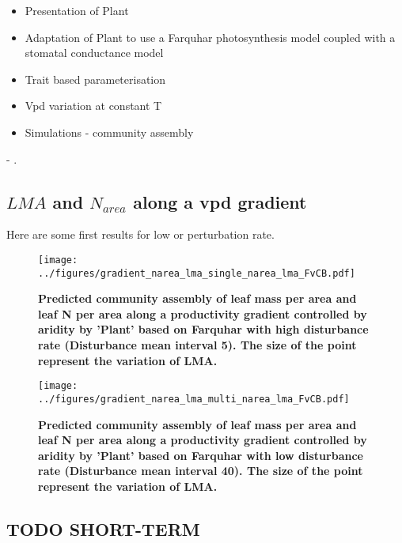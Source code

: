 \documentclass[a4paper,11pt]{article}
\begin{document}
\begin{itemize}

\item Presentation of Plant

\item Adaptation of Plant to use a Farquhar photosynthesis model coupled with a stomatal conductance model

\item Trait based parameterisation

\item Vpd variation at constant T
  
\item Simulations - community assembly 

\end{itemize}



- .

\clearpage

\subsection{$LMA$ and $N_{area}$ along a vpd gradient}

Here are some first results for low or perturbation rate.


\begin{figure}[ht]
\centering
\texttt{[image: ../figures/gradient\_narea\_lma\_single\_narea\_lma\_FvCB.pdf]}
\caption{\textbf{Predicted community assembly of leaf mass per area and leaf N per area along a productivity gradient controlled by aridity by 'Plant' based on Farquhar with high disturbance rate (Disturbance mean interval 5). The size of the point represent the variation of LMA.}
\label{fig:lma_nareaFh}}
\end{figure}


\begin{figure}[ht]
\centering
\texttt{[image: ../figures/gradient\_narea\_lma\_multi\_narea\_lma\_FvCB.pdf]}
\caption{\textbf{Predicted community assembly of leaf mass per area and leaf N per area along a productivity gradient controlled by aridity by 'Plant' based on Farquhar with low disturbance rate (Disturbance mean interval 40). The size of the point represent the variation of LMA.}
\label{fig:lma_nareaFl}}
\end{figure}


\clearpage

\subsection{TODO SHORT-TERM}
\end{document}
